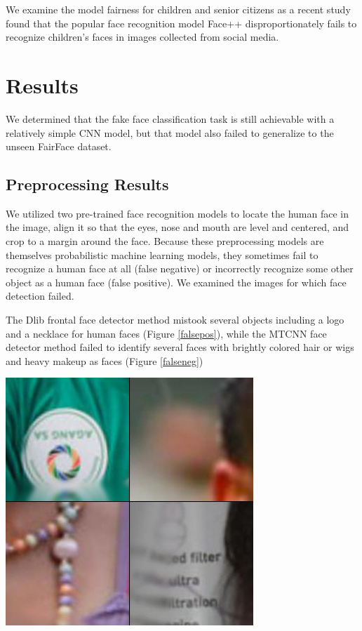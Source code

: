 \documentclass[11pt, letterpaper]{article}
\newenvironment{Figure}
  {\par\medskip\noindent\minipage{\linewidth}}
  {\endminipage\par\medskip}
\begin{document}
\begin{multicols}{2}
  We examine the model fairness for children and senior citizens as a recent
  study \cite{9156262} found that the popular face recognition model Face++
  disproportionately fails to recognize children's faces in images collected
  from social media.

  \section{Results}

  We determined that the fake face classification task is
  still achievable with a relatively simple CNN model, but that model also
  failed to generalize to the unseen FairFace dataset.

  \subsection{Preprocessing Results}

  We utilized two pre-trained face recognition models to locate the human face
  in the image, align it so that the eyes, nose and mouth are level and
  centered, and crop to a margin around the face. Because these preprocessing
  models are themselves probabilistic machine learning models, they sometimes
  fail to recognize a human face at all (false negative) or incorrectly
  recognize some other object as a human face (false positive). We examined the
  images for which face detection failed.

  The Dlib frontal face detector method mistook several objects including a logo
  and a necklace for human faces (Figure \ref{falsepos}), while the MTCNN face
  detector method failed to identify several faces with brightly colored hair or
  wigs and heavy makeup as faces (Figure \ref{falseneg})

  \begin{Figure}
    \centering
    \includegraphics[width=0.7\textwidth]{figures/false-positives.jpg}
    \label{falsepos}
  \end{Figure}


\end{multicols}
\end{document}
